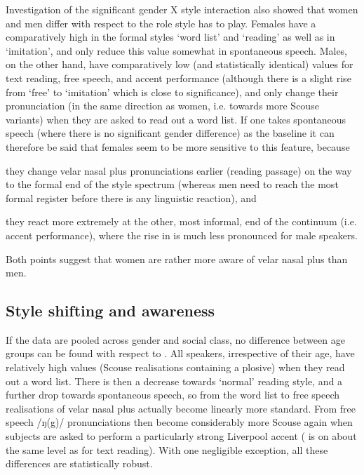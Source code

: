 Investigation of the significant gender X style interaction also showed that women and men differ with respect to the role style has to play.
Females have a comparatively high  in the formal styles `word list' and `reading' as well as in `imitation', and only reduce this value somewhat in spontaneous speech.
Males, on the other hand, have comparatively low (and statistically identical) values for text reading, free speech, and accent performance (although there is a slight rise from `free' to `imitation' which is close to significance), and only change their pronunciation (in the same direction as women, i.e. towards more Scouse variants) when they are asked to read out a word list.
If one takes spontaneous speech (where there is no significant gender difference) as the baseline it can therefore be said that females seem to be more sensitive to this feature, because
\begin{inparaenum}[(a)]
	\item they change velar nasal plus pronunciations earlier (reading passage) on the way to the formal end of the style spectrum (whereas men need to reach the most formal register before there is any linguistic reaction), and
	\item they react more extremely at the other, most informal, end of the continuum (i.e. accent performance), where the rise in  is much less pronounced for male speakers.
\end{inparaenum}
Both points suggest that women are rather more aware of velar nasal plus than men.

\subsection{Style shifting and awareness}
\label{prod.disc.ng.style}

If the data are pooled across gender and social class, no difference between age groups can be found with respect to .
All speakers, irrespective of their age, have relatively high  values (Scouse realisations containing a plosive) when they read out a word list.
There is then a decrease towards `normal' reading style, and a further drop towards spontaneous speech, so from the word list to free speech realisations of velar nasal plus actually become linearly more standard.
From free speech /ŋ(g)/ pronunciations then become considerably more Scouse again when subjects are asked to perform a particularly strong Liverpool accent ( is on about the same level as for text reading).
With one negligible exception, all these differences are statistically robust.

